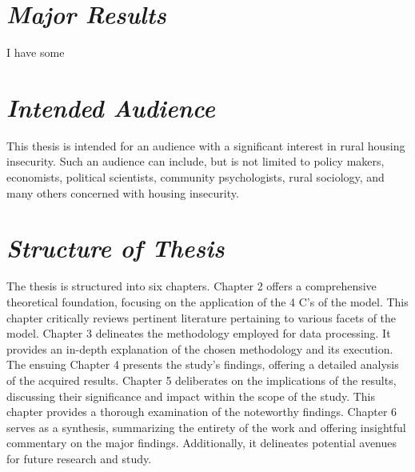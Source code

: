 \section{\textit{Major Results}}
I have some

\section{\textit{Intended Audience}}
This thesis is intended for an audience with a significant interest in rural housing insecurity. Such an audience can include, but is not limited to policy makers, economists, political scientists, community psychologists, rural sociology, and many others concerned with housing insecurity. 

\section{\textit{Structure of Thesis}}
The thesis is structured into six chapters. Chapter 2 offers a comprehensive theoretical foundation, focusing on the application of the 4 C's of the \hs model. This chapter critically reviews pertinent literature pertaining to various facets of the model. Chapter 3 delineates the methodology employed for data processing. It provides an in-depth explanation of the chosen methodology and its execution. The ensuing Chapter 4 presents the study's findings, offering a detailed analysis of the acquired results. Chapter 5 deliberates on the implications of the results, discussing their significance and impact within the scope of the study. This chapter provides a thorough examination of the noteworthy findings. Chapter 6 serves as a synthesis, summarizing the entirety of the work and offering insightful commentary on the major findings. Additionally, it delineates potential avenues for future research and study.

\endinput